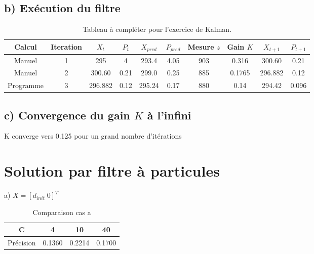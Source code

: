 \documentclass[11pt]{article}		%
\begin{document}
\subsection{b) Exécution du filtre}

\begin{table}[!ht]
\centering
\begin{tabular}{| c | c | c | c | c | c | c | c | c | c |}
 \hline
 Calcul    & Iteration & $X_t$ & $P_t$ & $X_{pred}$ & $P_{pred}$ & Mesure $z$ & Gain $K$ & $X_{t+1}$ & $P_{t+1}$ \\
 \hline
 Manuel    &    1      & 295   &   4   &    293.4   &    4.05    &  903       &   0.316  &   300.60  &    0.21   \\ 
 \hline
 Manuel    &    2      & 300.60&  0.21 &    299.0   &    0.25    &  885       &   0.1765 &   296.882 &    0.12   \\ 
 \hline
 Programme &    3      &296.882&  0.12 &    295.24  &    0.17    &  880       &   0.14   &   294.42  &    0.096  \\ 
 \hline
\end{tabular}
\caption{Tableau à compléter pour l'exercice de Kalman.}
\label{tab:KalmanMitaine}
\end{table}

\subsection{c) Convergence du gain $K$ à l'infini}
\noindent K converge vers 0.125 pour un grand nombre d'itérations

\newpage
\section {Solution par filtre à particules}
\label{Particules}

\noindent a) $X = [d_{init}\; 0]^T$ \\

\begin{table}[!ht]
\centering
\begin{tabular}{| c | c | c | c |}
 \hline
  C            &    4      &   10   &   40  \\ 
 \hline
  Précision    &   0.1360  & 0.2214 & 0.1700 \\ 
 \hline
\end{tabular}
\caption{Comparaison cas a}
\label{tab:FilterParticle1}
\end{table}
\end{document}

